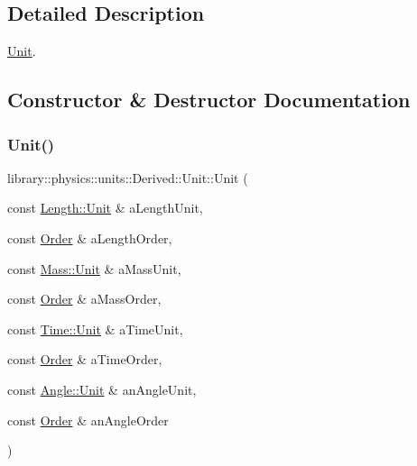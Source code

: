 \subsection{Detailed Description}
\hyperlink{classlibrary_1_1physics_1_1units_1_1_derived_1_1_unit}{Unit}. 

\subsection{Constructor \& Destructor Documentation}
\mbox{\label{classlibrary_1_1physics_1_1units_1_1_derived_1_1_unit_afae7260b526cdd8379eda7e69d7b42b8}} 
\subsubsection{\texorpdfstring{Unit()}{Unit()}}
{\footnotesize\ttfamily library\+::physics\+::units\+::\+Derived\+::\+Unit\+::\+Unit (\begin{DoxyParamCaption}\item[{const \hyperlink{classlibrary_1_1physics_1_1units_1_1_length_a3b8b39cd245cf6b19dc34459baeccb18}{Length\+::\+Unit} \&}]{a\+Length\+Unit,  }\item[{const \hyperlink{classlibrary_1_1physics_1_1units_1_1_derived_1_1_order}{Order} \&}]{a\+Length\+Order,  }\item[{const \hyperlink{classlibrary_1_1physics_1_1units_1_1_mass_a95f1e0434bc16794926b8e273bc2a54b}{Mass\+::\+Unit} \&}]{a\+Mass\+Unit,  }\item[{const \hyperlink{classlibrary_1_1physics_1_1units_1_1_derived_1_1_order}{Order} \&}]{a\+Mass\+Order,  }\item[{const \hyperlink{classlibrary_1_1physics_1_1units_1_1_time_ab876a6a05c9a2f28905f2753bfd64109}{Time\+::\+Unit} \&}]{a\+Time\+Unit,  }\item[{const \hyperlink{classlibrary_1_1physics_1_1units_1_1_derived_1_1_order}{Order} \&}]{a\+Time\+Order,  }\item[{const \hyperlink{classlibrary_1_1physics_1_1units_1_1_angle_a3c329d415a61783b16ce481874cc5956}{Angle\+::\+Unit} \&}]{an\+Angle\+Unit,  }\item[{const \hyperlink{classlibrary_1_1physics_1_1units_1_1_derived_1_1_order}{Order} \&}]{an\+Angle\+Order }\end{DoxyParamCaption})}



